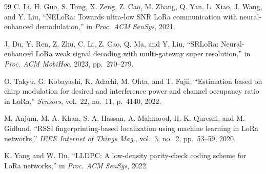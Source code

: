 \documentclass[journal]{IEEEtran}
\begin{document}
\begin{thebibliography}{99}
C. Li, H. Guo, S. Tong, X. Zeng, Z. Cao, M. Zhang, Q. Yan, L. Xiao, J. Wang, and Y. Liu, ``NELoRa: Towards ultra-low SNR LoRa communication with neural-enhanced demodulation,'' in \emph{Proc. ACM SenSys}, 2021.

J. Du, Y. Ren, Z. Zhu, C. Li, Z. Cao, Q. Ma, and Y. Liu, ``SRLoRa: Neural-enhanced LoRa weak signal decoding with multi-gateway super resolution,'' in \emph{Proc. ACM MobiHoc}, 2023, pp.\ 270--279.

O. Takyu, G. Kobayashi, K. Adachi, M. Ohta, and T. Fujii, ``Estimation based on chirp modulation for desired and interference power and channel occupancy ratio in LoRa,'' \emph{Sensors}, vol.\ 22, no.\ 11, p.\ 4140, 2022.

M. Anjum, M. A. Khan, S. A. Hassan, A. Mahmood, H. K. Qureshi, and M. Gidlund, ``RSSI fingerprinting-based localization using machine learning in LoRa networks,'' \emph{IEEE Internet of Things Mag.}, vol.\ 3, no.\ 2, pp.\ 53--59, 2020.

K. Yang and W. Du, ``LLDPC: A low-density parity-check coding scheme for LoRa networks,'' in \emph{Proc. ACM SenSys}, 2022.

\end{thebibliography}
\end{document}
